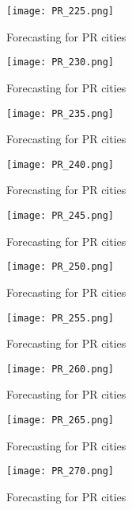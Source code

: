  \begin{figure}[!ht] 
 \centering 
 \texttt{[image: PR\_225.png]} 
 \caption{Forecasting for PR cities } 
 \label{fig:PR_225} 
 \end{figure} 
 
 \begin{figure}[!ht] 
 \centering 
 \texttt{[image: PR\_230.png]} 
 \caption{Forecasting for PR cities } 
 \label{fig:PR_230} 
 \end{figure} 
 
 \begin{figure}[!ht] 
 \centering 
 \texttt{[image: PR\_235.png]} 
 \caption{Forecasting for PR cities } 
 \label{fig:PR_235} 
 \end{figure} 
 
 \begin{figure}[!ht] 
 \centering 
 \texttt{[image: PR\_240.png]} 
 \caption{Forecasting for PR cities } 
 \label{fig:PR_240} 
 \end{figure} 
 
 \begin{figure}[!ht] 
 \centering 
 \texttt{[image: PR\_245.png]} 
 \caption{Forecasting for PR cities } 
 \label{fig:PR_245} 
 \end{figure} 
 
 \begin{figure}[!ht] 
 \centering 
 \texttt{[image: PR\_250.png]} 
 \caption{Forecasting for PR cities } 
 \label{fig:PR_250} 
 \end{figure} 
 
 \begin{figure}[!ht] 
 \centering 
 \texttt{[image: PR\_255.png]} 
 \caption{Forecasting for PR cities } 
 \label{fig:PR_255} 
 \end{figure} 
 
 \begin{figure}[!ht] 
 \centering 
 \texttt{[image: PR\_260.png]} 
 \caption{Forecasting for PR cities } 
 \label{fig:PR_260} 
 \end{figure} 
 
 \begin{figure}[!ht] 
 \centering 
 \texttt{[image: PR\_265.png]} 
 \caption{Forecasting for PR cities } 
 \label{fig:PR_265} 
 \end{figure} 
 
 \begin{figure}[!ht] 
 \centering 
 \texttt{[image: PR\_270.png]} 
 \caption{Forecasting for PR cities } 
 \label{fig:PR_270} 
 \end{figure} 
 

